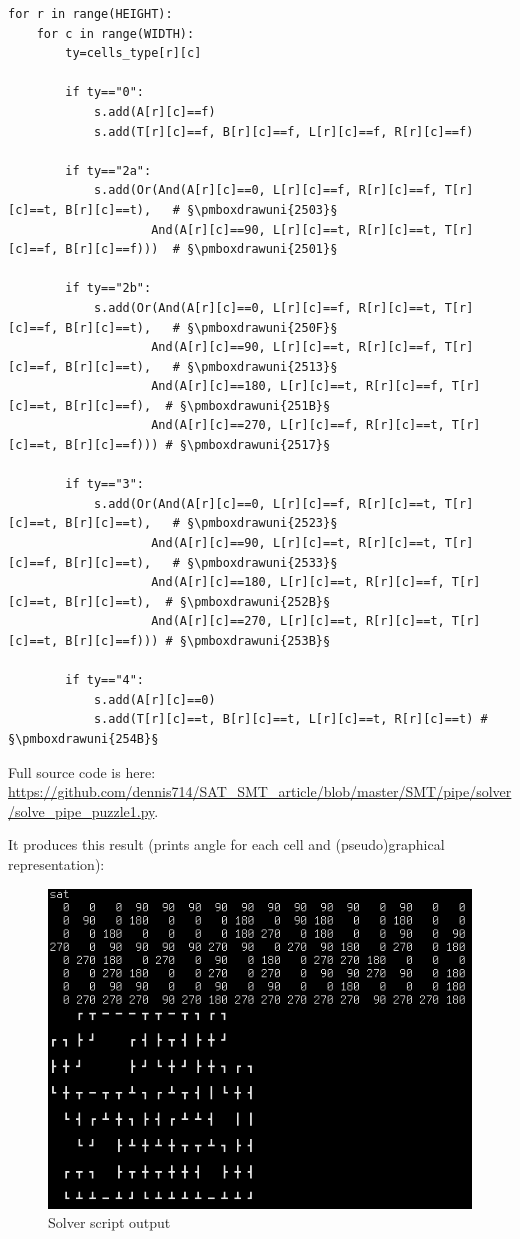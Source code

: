 \begin{lstlisting}
for r in range(HEIGHT):
    for c in range(WIDTH):
        ty=cells_type[r][c]

        if ty=="0":
            s.add(A[r][c]==f)
            s.add(T[r][c]==f, B[r][c]==f, L[r][c]==f, R[r][c]==f)

        if ty=="2a":
            s.add(Or(And(A[r][c]==0, L[r][c]==f, R[r][c]==f, T[r][c]==t, B[r][c]==t),   # §\pmboxdrawuni{2503}§
                    And(A[r][c]==90, L[r][c]==t, R[r][c]==t, T[r][c]==f, B[r][c]==f)))  # §\pmboxdrawuni{2501}§

        if ty=="2b":
            s.add(Or(And(A[r][c]==0, L[r][c]==f, R[r][c]==t, T[r][c]==f, B[r][c]==t),   # §\pmboxdrawuni{250F}§
                    And(A[r][c]==90, L[r][c]==t, R[r][c]==f, T[r][c]==f, B[r][c]==t),   # §\pmboxdrawuni{2513}§
                    And(A[r][c]==180, L[r][c]==t, R[r][c]==f, T[r][c]==t, B[r][c]==f),  # §\pmboxdrawuni{251B}§
                    And(A[r][c]==270, L[r][c]==f, R[r][c]==t, T[r][c]==t, B[r][c]==f))) # §\pmboxdrawuni{2517}§
	
        if ty=="3":
            s.add(Or(And(A[r][c]==0, L[r][c]==f, R[r][c]==t, T[r][c]==t, B[r][c]==t),   # §\pmboxdrawuni{2523}§
                    And(A[r][c]==90, L[r][c]==t, R[r][c]==t, T[r][c]==f, B[r][c]==t),   # §\pmboxdrawuni{2533}§
                    And(A[r][c]==180, L[r][c]==t, R[r][c]==f, T[r][c]==t, B[r][c]==t),  # §\pmboxdrawuni{252B}§
                    And(A[r][c]==270, L[r][c]==t, R[r][c]==t, T[r][c]==t, B[r][c]==f))) # §\pmboxdrawuni{253B}§

        if ty=="4":
            s.add(A[r][c]==0)
            s.add(T[r][c]==t, B[r][c]==t, L[r][c]==t, R[r][c]==t) # §\pmboxdrawuni{254B}§
\end{lstlisting}

Full source code is here: \url{https://github.com/dennis714/SAT_SMT_article/blob/master/SMT/pipe/solver/solve_pipe_puzzle1.py}.

It produces this result (prints angle for each cell and (pseudo)graphical representation):

\begin{figure}[H]
\centering
\includegraphics[scale=0.75]{SMT/pipe/solver/solver.png}
\caption{Solver script output}
\end{figure}

